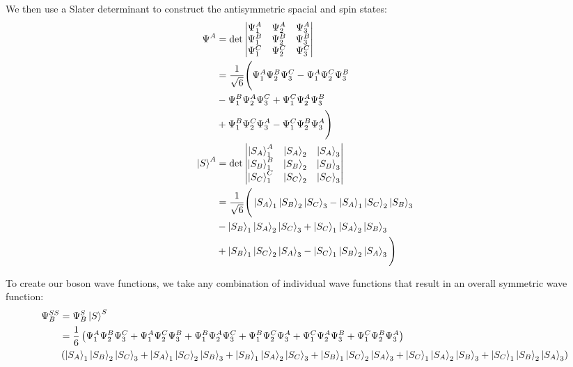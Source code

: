 \documentclass[10pt]{article} %
\begin{document}
We then use a Slater determinant to construct the antisymmetric spacial and spin states:\\

\begin{align*}
  \Psi^{A} &= \det
  \begin{vmatrix}
    \Psi_1^A & \Psi_2^A & \Psi_3^A\\
    \Psi_1^B & \Psi_2^B & \Psi_3^B\\
    \Psi_1^C & \Psi_2^C & \Psi_3^C\\
  \end{vmatrix}\\
  &= \frac{1}{\sqrt{6}}\Bigg(\Psi_1^A\Psi_2^B\Psi_3^C - \Psi_1^A\Psi_2^C\Psi_3^B\\
  &- \Psi_1^B\Psi_2^A\Psi_3^C + \Psi_1^C\Psi_2^A\Psi_3^B\\
  &+ \Psi_1^B\Psi_2^C\Psi_3^A - \Psi_1^C\Psi_2^B\Psi_3^A\Bigg)\\
  \ket{S}^A &= \det
  \begin{vmatrix}
    \ket{S_A}_1^A & \ket{S_A}_2 & \ket{S_A}_3\\
    \ket{S_B}_1^B & \ket{S_B}_2 & \ket{S_B}_3\\
    \ket{S_C}_1^C & \ket{S_C}_2 & \ket{S_C}_3\\
  \end{vmatrix}\\
  &= \frac{1}{\sqrt{6}}\Bigg(\ket{S_A}_1\ket{S_B}_2\ket{S_C}_3 - \ket{S_A}_1\ket{S_C}_2\ket{S_B}_3\\
  &- \ket{S_B}_1\ket{S_A}_2\ket{S_C}_3 + \ket{S_C}_1\ket{S_A}_2\ket{S_B}_3\\
  &+ \ket{S_B}_1\ket{S_C}_2\ket{S_A}_3 - \ket{S_C}_1\ket{S_B}_2\ket{S_A}_3\Bigg)\\
\end{align*}

To create our boson wave functions, we take any combination of individual wave functions that result
in an overall symmetric wave function:\\

\begin{align*}
  \Psi_B^{SS} &= \Psi_B^S\ket{S}^S\\
  &= \frac{1}{6}\left(\Psi_1^A\Psi_2^B\Psi_3^C + \Psi_1^A\Psi_2^C\Psi_3^B
  + \Psi_1^B\Psi_2^A\Psi_3^C + \Psi_1^B\Psi_2^C\Psi_3^A
  + \Psi_1^C\Psi_2^A\Psi_3^B + \Psi_1^C\Psi_2^B\Psi_3^A\right)\\
  &\left(\ket{S_A}_1\ket{S_B}_2\ket{S_C}_3 + \ket{S_A}_1\ket{S_C}_2\ket{S_B}_3
  + \ket{S_B}_1\ket{S_A}_2\ket{S_C}_3 + \ket{S_B}_1\ket{S_C}_2\ket{S_A}_3
  + \ket{S_C}_1\ket{S_A}_2\ket{S_B}_3 + \ket{S_C}_1\ket{S_B}_2\ket{S_A}_3\right)
\end{align*}
\end{document}
